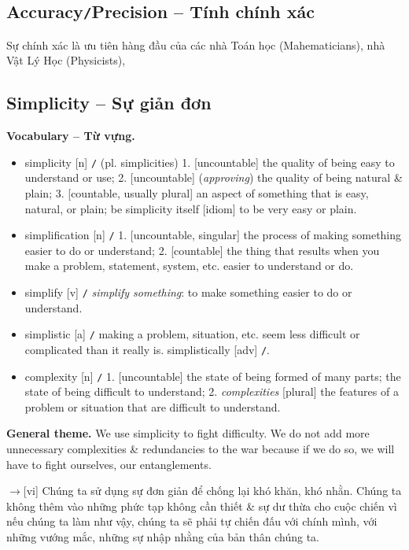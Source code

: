 \documentclass[12pt,oneside]{book}
\begin{document}
\subsection{Accuracy{\tt/}Precision -- Tính chính xác}
Sự chính xác là ưu tiên hàng đầu của các nhà Toán học (Mahematicians), nhà Vật Lý Học (Physicists), 

\subsection{Simplicity -- Sự giản đơn}
\textbf{\textsf{\small Vocabulary -- Từ vựng.}}
\begin{itemize}\small
	\item {\sf simplicity} [n] {\tt/} (pl. simplicities) 1. [uncountable] the quality of being easy to understand or use; 2. [uncountable] ({\it approving}) the quality of being natural \& plain; 3. [countable, usually plural] an aspect of something that is easy, natural, or plain; {\sf be simplicity itself} [idiom] to be very easy or plain.
	\item {\sf simplification} [n] {\tt/} 1. [uncountable, singular] the process of making something easier to do or understand; 2. [countable] the thing that results when you make a problem, statement, system, etc. easier to understand or do.
	\item {\sf simplify} [v] {\tt/} {\it simplify something}: to make something easier to do or understand.
	\item {\sf simplistic} [a] {\tt/} making a problem, situation, etc. seem less difficult or complicated than it really is. {\sf simplistically} [adv] {\tt/}.
	\item {\sf complexity} [n] {\tt/} 1. [uncountable] the state of being formed of many parts; the state of being difficult to understand; 2. {\it complexities} [plural] the features of a problem or situation that are difficult to understand.
\end{itemize}
{\bf General theme.} We use simplicity to fight difficulty. We do not add more unnecessary complexities \& redundancies to the war because if we do so, we will have to fight ourselves, our entanglements.

{\sf[en]$\to$[vi]} Chúng ta sử dụng sự đơn giản để chống lại khó khăn, khó nhằn. Chúng ta không thêm vào những phức tạp không cần thiết \& sự dư thừa cho cuộc chiến vì nếu chúng ta làm như vậy, chúng ta sẽ phải tự chiến đấu với chính mình, với những vướng mắc, những sự nhập nhằng của bản thân chúng ta.
\end{document}
